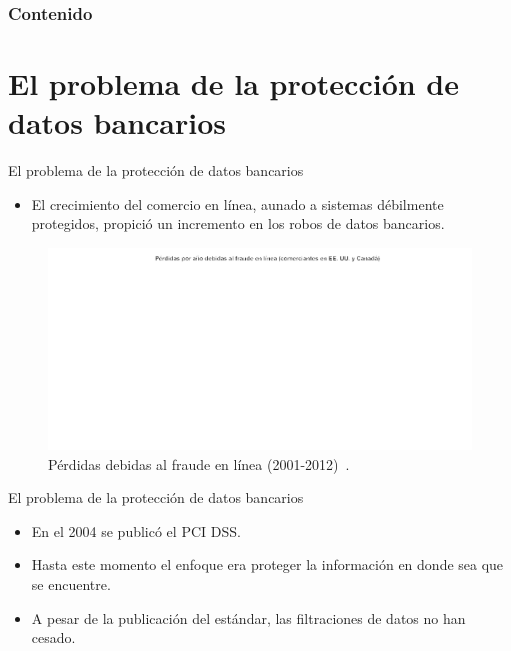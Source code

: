 \documentclass{beamer}
\begin{document}
  {
  \frame{\titlepage}}

  \begin{frame}
    \frametitle{Contenido}
    \setcounter{tocdepth}{1}
    \tableofcontents
  \end{frame}

  \setlength{\parskip}{0.5em}

  \section{El problema de la protección de datos bancarios}

  \begin{frame}{El problema de la protección de datos bancarios}
    \begin{itemize}
      \item El crecimiento del comercio en línea, aunado a sistemas débilmente
        protegidos, propició un incremento en los robos de datos bancarios.
    \end{itemize}

    \begin{figure}[H]
      \centering
      \includegraphics[width=0.9\linewidth]
         {diagramas_comunes/intro/perdidas_fraude_bn.png}
      \caption{Pérdidas debidas al fraude en línea (2001-2012)~\cite{wallethub}.}
    \end{figure}
  \end{frame}

  \begin{frame}{El problema de la protección de datos bancarios}
    \begin{itemize}
      \item En el 2004 se publicó el PCI DSS\footnotemark \cite{pci_dss}.
      \item Hasta este momento el enfoque era proteger la información en donde
        sea que se encuentre.
      \item A pesar de la publicación del estándar, las filtraciones de datos
        no han cesado.
    \end{itemize}
  \end{frame}
\end{document}
